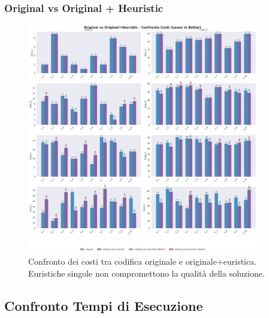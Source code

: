 \documentclass[11pt,a4paper]{article}
\begin{document}
\subsubsection{Original vs Original + Heuristic}
\begin{figure}[H]
  \centering
  \includegraphics[width=0.9\textwidth]{../Results/graphs/cost_comparison_original_vs_original_heuristic.png}
  \caption{Confronto dei costi tra codifica originale e originale+euristica. 
  Euristiche singole non compromettono la qualità della soluzione.}
\end{figure}

\subsection{Confronto Tempi di Esecuzione}
\end{document}
